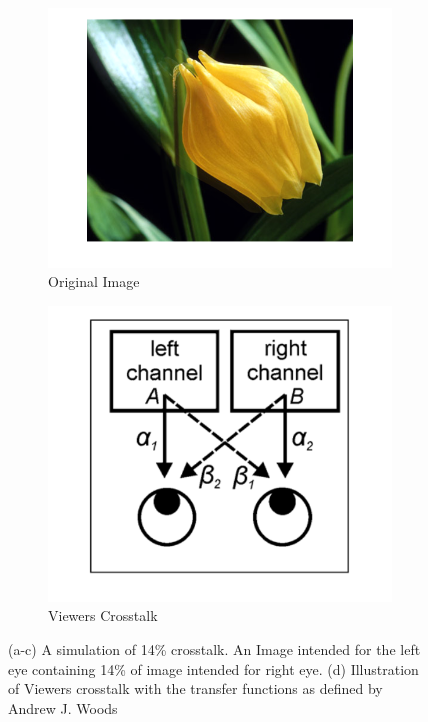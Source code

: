 \begin{figure}[htbp]
    \begin{subfigure}[b]{0.3\textwidth}
        \includegraphics[width=\textwidth]{./Template_Figures/crosstalk}
        \caption{Original Image}\label{fig:imWCT}
    \end{subfigure}

    \begin{subfigure}[b]{0.3\textwidth}
        \includegraphics[width=\textwidth]{./Template_Figures/viewerCT}
        \caption{Viewers Crosstalk}\label{fig:viewerCT}
    \end{subfigure}

    \caption{(a-c) A simulation of 14\% crosstalk. An Image intended for the left eye containing 14\% of image intended for right eye. (d) Illustration of Viewers crosstalk with the transfer functions as defined by Andrew J. Woods \cite{woods2012crosstalk} \label{fig:ct1}}
\end{figure}

